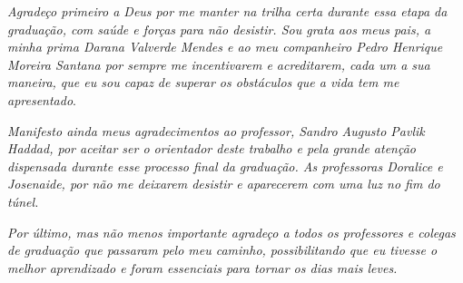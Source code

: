 \begin{agradecimentos}
 
\textit{Agradeço primeiro a Deus por me manter na trilha certa durante essa etapa da graduação, com saúde e forças para não desistir. Sou grata aos meus pais, a minha prima Darana Valverde Mendes e ao meu companheiro Pedro Henrique Moreira Santana por sempre me incentivarem e acreditarem, cada um a sua maneira, que eu sou capaz de superar os obstáculos que a vida tem me apresentado}.

\textit{Manifesto ainda meus agradecimentos ao professor, Sandro Augusto Pavlik Haddad, por aceitar ser o orientador deste trabalho e pela grande atenção dispensada durante esse processo final da graduação. As professoras Doralice e Josenaide, por não me deixarem desistir e aparecerem com uma luz no fim do túnel.}

\textit{Por último, mas não menos importante agradeço a todos os professores e colegas de graduação que passaram pelo meu caminho, possibilitando que eu tivesse o melhor aprendizado e foram essenciais para tornar os dias mais leves.
}

\end{agradecimentos}
